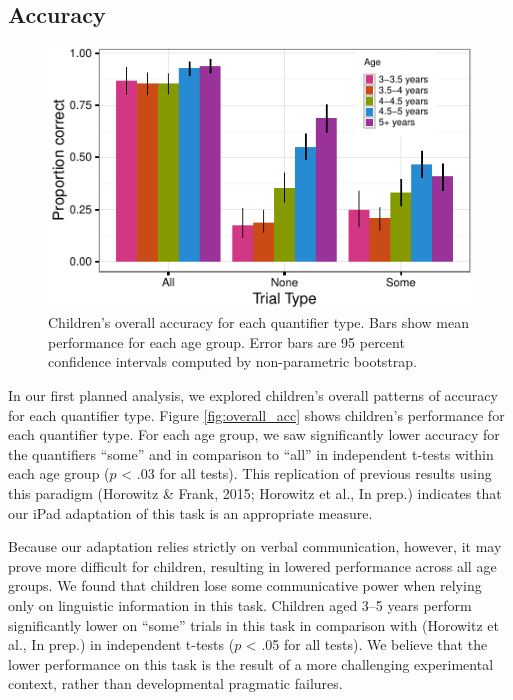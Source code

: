 \documentclass[10pt, letterpaper]{article}
\newenvironment{CodeChunk}{}{}
\begin{document}
\subsection{Accuracy}\label{accuracy}

\begin{CodeChunk}
\begin{figure}[h]
\includegraphics{figs/overll_acc-1} \caption[Children's overall accuracy for each quantifier type]{Children's overall accuracy for each quantifier type. Bars show mean performance for each age group. Error bars are 95 percent confidence intervals computed by non-parametric bootstrap.}\label{fig:overll_acc}
\end{figure}
\end{CodeChunk}

In our first planned analysis, we explored children's overall patterns
of accuracy for each quantifier type. Figure \ref{fig:overall_acc} shows
children's performance for each quantifier type. For each age group, we
saw significantly lower accuracy for the quantifiers ``some'' and in
comparison to ``all'' in independent t-tests within each age group
(\(p\) \textless{} .03 for all tests). This replication of previous
results using this paradigm (Horowitz \& Frank, 2015; Horowitz et al.,
In prep.) indicates that our iPad adaptation of this task is an
appropriate measure.

Because our adaptation relies strictly on verbal communication, however,
it may prove more difficult for children, resulting in lowered
performance across all age groups. We found that children lose some
communicative power when relying only on linguistic information in this
task. Children aged 3--5 years perform significantly lower on ``some''
trials in this task in comparison with (Horowitz et al., In prep.) in
independent t-tests (\(p\) \textless{} .05 for all tests). We believe
that the lower performance on this task is the result of a more
challenging experimental context, rather than developmental pragmatic
failures.
\end{document}
